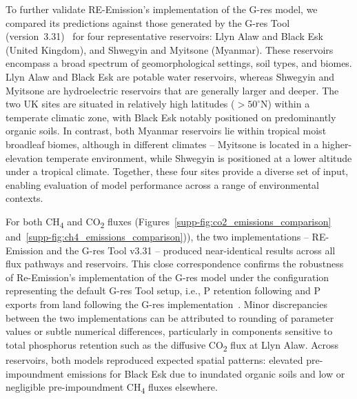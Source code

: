 \documentclass[10pt]{article}
\begin{document}
To further validate RE-Emission's implementation of the G-res model, we compared its predictions against those generated by the G-res Tool (version~3.31)~\citep{prairie2017gres} for four representative reservoirs: Llyn Alaw and Black Esk (United Kingdom), and Shwegyin and Myitsone (Myanmar). 
These reservoirs encompass a broad spectrum of geomorphological settings, soil types, and biomes. 
Llyn Alaw and Black Esk are potable water reservoirs, whereas Shwegyin and Myitsone are hydroelectric reservoirs that are generally larger and deeper. 
The two UK sites are situated in relatively high latitudes ($>50^{\circ}$N) within a temperate climatic zone, with Black Esk notably positioned on predominantly organic soils. 
In contrast, both Myanmar reservoirs lie within tropical moist broadleaf biomes, although in different climates -- Myitsone is located in a higher-elevation temperate environment, while Shwegyin is positioned at a lower altitude under a tropical climate. 
Together, these four sites provide a diverse set of input, enabling evaluation of model performance across a range of environmental contexts. 

For both CH\textsubscript{4} and CO\textsubscript{2} fluxes (Figures~\ref{supp-fig:co2_emissions_comparison} and~\ref{supp-fig:ch4_emissions_comparison})), the two implementations -- RE-Emission and the G-res Tool v3.31 -- produced near-identical results across all flux pathways and reservoirs.
This close correspondence confirms the robustness of Re-Emission's implementation of the G-res model under the configuration representing the default G-res Tool setup, i.e., \ac{P} retention following \citet{larsen1976} and \ac{P} exports from land following the G-res implementation~\cite{Prairie2021}.
Minor discrepancies between the two implementations can be attributed to rounding of parameter values or subtle numerical differences, particularly in components sensitive to total phosphorus retention such as the diffusive CO\textsubscript{2} flux at Llyn Alaw.
Across reservoirs, both models reproduced expected spatial patterns: elevated pre-impoundment emissions for Black Esk due to inundated organic soils and low or negligible pre-impoundment CH\textsubscript{4} fluxes elsewhere.
\end{document}
